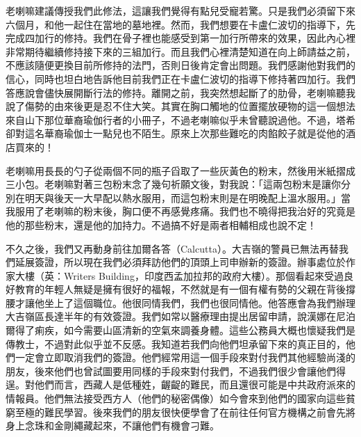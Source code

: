 老喇嘛建議傳授我們此修法，這讓我們覺得有點兒受寵若驚。只是我們必須留下來六個月，和他一起住在當地的墓地裡。然而，我們想要在卡盧仁波切的指導下，先完成四加行的修持。我們在骨子裡也能感受到第一加行所帶來的效果，因此內心裡非常期待繼續修持接下來的三組加行。而且我們心裡清楚知道在向上師請益之前，不應該隨便更換目前所修持的法門，否則日後肯定會出問題。我們感謝他對我們的信心，同時也坦白地告訴他目前我們正在卡盧仁波切的指導下修持著四加行。我們答應說會儘快展開斷行法的修持。離開之前，我突然想起斷了的肋骨，老喇嘛聽我說了傷勢的由來後更是忍不住大笑。其實在胸口觸地的位置擺放硬物的這一個想法來自山下那位華裔瑜伽行者的小冊子，不過老喇嘛似乎未曾聽說過他。不過，塔希卻對這名華裔瑜伽士一點兒也不陌生。原來上次那些難吃的肉餡餃子就是從他的酒店買來的！

老喇嘛用長長的勺子從兩個不同的瓶子舀取了一些灰黃色的粉末，然後用米紙摺成三小包。老喇嘛對著三包粉末念了幾句祈願文後，對我說：「這兩包粉末是讓你分別在明天與後天一大早配以熱水服用，而這包粉末則是在明晚配上溫水服用。」當我服用了老喇嘛的粉末後，胸口便不再感覺疼痛。我們也不曉得把我治好的究竟是他的那些粉末，還是他的加持力。不過搞不好是兩者相輔相成也說不定！

不久之後，我們又再動身前往加爾各答（Calcutta）。大吉嶺的警員已無法再替我們延展簽證，所以現在我們必須拜訪他們的頂頭上司申辦新的簽證。辦事處位於作家大樓（英：Writers
Building，印度西孟加拉邦的政府大樓）。那個看起來受過良好教育的年輕人無疑是擁有很好的福報，不然就是有一個有權有勢的父親在背後撐腰才讓他坐上了這個職位。他很同情我們，我們也很同情他。他答應會為我們辦理大吉嶺區長達半年的有效簽證。我們如常以醫療理由提出居留申請，說漢娜在尼泊爾得了痢疾，如今需要山區清新的空氣來調養身體。這些公務員大概也懷疑我們是傳教士，不過對此似乎並不反感。我知道若我們向他們坦承留下來的真正目的，他們一定會立即取消我們的簽證。他們經常用這一個手段來對付我們其他經驗尚淺的朋友，後來他們也曾試圖要用同樣的手段來對付我們，不過我們很少會讓他們得逞。對他們而言，西藏人是低種姓，齷齪的難民，而且還很可能是中共政府派來的情報員。他們無法接受西方人（他們的秘密偶像）如今會來到他們的國家向這些貧窮至極的難民學習。後來我們的朋友很快便學會了在前往任何官方機構之前會先將身上念珠和金剛繩藏起來，不讓他們有機會刁難。

